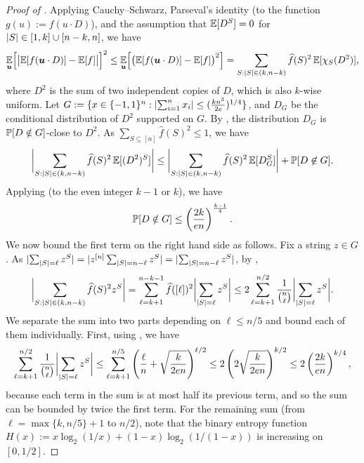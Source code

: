 \documentclass[10pt,a4paper]{article}
\theoremstyle{definition}
\renewcommand{\Pr}{\mathop{\mathbb{P}\/}}
\newcommand{\E}{\mathop{\mathbb{E}\/}}
\newcommand{\wh}[1]{\widehat{#1}}
\newcommand{\pmo}{\{-1,1\}}
\newcommand{\bu}{\boldsymbol{u}}
\newcommand{\hf}{\wh{f}}
\DeclarePairedDelimiter\abs{\lvert}{\rvert}
\begin{document}
\begin{proof}[Proof of ]
  Applying Cauchy--Schwarz, Parseval's identity (to the function $g(u) := f(u \cdot D)$), and the assumption that $\E[D^S] = 0$ for $\abs{S} \in [1,k] \cup [n-k,n]$, we have
  \[
    \E_{\bu}\Bigl[ \abs[\big]{ \E[f(\bu \cdot D)] - \E[f] } \Bigr]^2
    \le \E_{\bu}\Bigl[ \bigl( \E[f(\bu \cdot D)] - \E[f] \bigr)^2 \Bigr]
    = \sum_{S: \abs{S} \in (k,n-k)} \hf(S)^2 \E[\chi_S(D^2)] ,
  \]
  where $D^2$ is the sum of two independent copies of $D$, which is also $k$-wise uniform.
  Let $G := \{x \in \pmo^n : \abs{\sum_{i=1}^n x_i} \le (\frac{kn^3}{2e})^{1/4} \}$, and $D_G$ be the conditional distribution of $D^2$ supported on $G$.
  By , the distribution $D_G$ is $\Pr[D\notin G]$-close to $D^2$.
  As $\sum_{S \subseteq [n]} \hf(S)^2 \le 1$, we have
  \[
    \abs[\bigg]{ \sum_{S: \abs{S} \in (k,n-k)} \hf(S)^2 \E[(D^2)^S] }
    \le \abs[\bigg]{ \sum_{S: \abs{S} \in (k,n-k)} \hf(S)^2 \E[D_G^S] } + \Pr[D \not\in G] .
  \]
  Applying  (to the even integer $k-1$ or $k$), we have
  \begin{align} \label{eq:Bazzi-tail}
    \Pr[ D \notin G ]
    \le \left( \frac{2k}{en} \right)^{\frac{k-1}{4}} .
  \end{align}
  We now bound the first term on the right hand side as follows.
  Fix a string $z \in G$.
  As $\abs{\sum_{\abs{S}=\ell} z^S} = \abs{ z^{[n]} \sum_{\abs{S}=n-\ell} z^S} = \abs{\sum_{\abs{S}=n-\ell} z^S}$, by , 
  \[
    \abs[\bigg]{ \sum_{S: \abs{S} \in (k,n-k)} \hf(S)^2 z^S }
    = \sum_{\ell=k+1}^{n-k-1} \hf([\ell])^2 \abs[\bigg]{\sum_{\abs{S}=\ell} z^S}
    \le 2 \sum_{\ell=k+1}^{n/2} \frac{1}{\binom{n}{\ell}} \abs[\bigg]{\sum_{\abs{S}=\ell} z^S} .
  \]
  We separate the sum into two parts depending on $\ell \le n/5$ and bound each of them individually.
  First, using , we have
  \begin{align} \label{eq:Bazzi-1}
    \sum_{\ell=k+1}^{n/2} \frac{1}{\binom{n}{\ell}} \abs[\bigg]{\sum_{\abs{S}=\ell} z^S}
    \le \sum_{\ell=k+1}^{n/5} \left( \frac{\ell}{n} + \sqrt{\frac{k}{2en}} \right)^{\ell/2}
    \le 2 \left( 2 \sqrt{\frac{k}{2en}} \right)^{k/2} 
    \le 2 \left( \frac{2k}{en} \right)^{k/4} ,
  \end{align}
  because each term in the sum is at most half its previous term, and so the sum can be bounded by twice the first term.
  For the remaining sum (from $\ell=\max\{k,n/5\}+1$ to $n/2$), note that the binary entropy function $H(x) := x \log_2(1/x) + (1-x) \log_2(1/(1-x))$ is increasing on $[0,1/2]$.

\end{proof}
\end{document}
